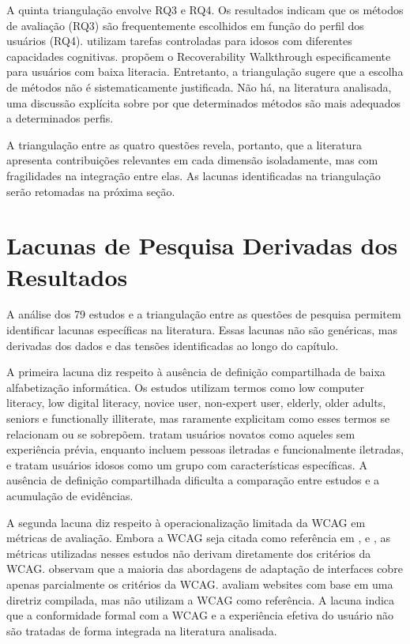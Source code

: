 A quinta triangulação envolve RQ3 e RQ4. Os resultados indicam que os métodos de avaliação (RQ3) são frequentemente escolhidos em função do perfil dos usuários (RQ4). \cite{sharit2008information} utilizam tarefas controladas para idosos com diferentes capacidades cognitivas. \cite{filgueiras2009recoverability} propõem o Recoverability Walkthrough especificamente para usuários com baixa literacia. Entretanto, a triangulação sugere que a escolha de métodos não é sistematicamente justificada. Não há, na literatura analisada, uma discussão explícita sobre por que determinados métodos são mais adequados a determinados perfis.

A triangulação entre as quatro questões revela, portanto, que a literatura apresenta contribuições relevantes em cada dimensão isoladamente, mas com fragilidades na integração entre elas. As lacunas identificadas na triangulação serão retomadas na próxima seção.


\section{Lacunas de Pesquisa Derivadas dos Resultados}

\label{sec:lacunas_resultados}

A análise dos 79 estudos e a triangulação entre as questões de pesquisa permitem identificar lacunas específicas na literatura. Essas lacunas não são genéricas, mas derivadas dos dados e das tensões identificadas ao longo do capítulo.

A primeira lacuna diz respeito à ausência de definição compartilhada de baixa alfabetização informática. Os estudos utilizam termos como low computer literacy, low digital literacy, novice user, non-expert user, elderly, older adults, seniors e functionally illiterate, mas raramente explicitam como esses termos se relacionam ou se sobrepõem. \cite{nosseir2011novice} tratam usuários novatos como aqueles sem experiência prévia, enquanto \cite{filgueiras2009recoverability} incluem pessoas iletradas e funcionalmente iletradas, e \cite{kurniawan2005research} tratam usuários idosos como um grupo com características específicas. A ausência de definição compartilhada dificulta a comparação entre estudos e a acumulação de evidências.

A segunda lacuna diz respeito à operacionalização limitada da WCAG em métricas de avaliação. Embora a WCAG seja citada como referência em \cite{sun2010preliminary}, \cite{wickramathilaka2023addressing} e \cite{gonzalez2025augmenting}, as métricas utilizadas nesses estudos não derivam diretamente dos critérios da WCAG. \cite{wickramathilaka2023addressing} observam que a maioria das abordagens de adaptação de interfaces cobre apenas parcialmente os critérios da WCAG. \cite{dombrovskaia2021guideline} avaliam websites com base em uma diretriz compilada, mas não utilizam a WCAG como referência. A lacuna indica que a conformidade formal com a WCAG e a experiência efetiva do usuário não são tratadas de forma integrada na literatura analisada.

